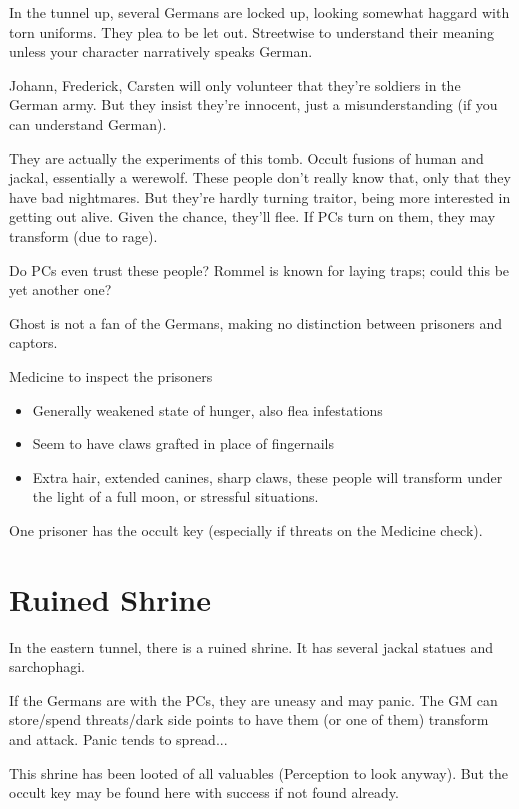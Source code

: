 \documentclass{book}
\newcommand{\df}{\DifficultyDie }
\newcommand{\stb}{\SetbackDie }
\newcommand{\ch}{\ChallengeDie }
\begin{document}
\begin{multicols}{2}
In the tunnel up, several Germans are locked up, looking somewhat haggard with torn uniforms.  They plea to be let out.  \df\df Streetwise to understand their meaning unless your character narratively speaks German.

Johann, Frederick, Carsten will only volunteer that they're soldiers in the German army.  But they insist they're innocent, just a misunderstanding (if you can understand German).

They are actually the experiments of this tomb.  Occult fusions of human and jackal, essentially a werewolf.  These people don't really know that, only that they have bad nightmares.  But they're hardly turning traitor, being more interested in getting out alive.  Given the chance, they'll flee.  If PCs turn on them, they may transform (due to rage).

Do PCs even trust these people?  Rommel is known for laying traps; could this be yet another one?

Ghost is not a fan of the Germans, making no distinction between prisoners and captors.

\df\df\stb\stb Medicine to inspect the prisoners
    \begin{itemize}
        \item \Success Generally weakened state of hunger, also flea infestations
        \item \Advantage\Advantage Seem to have claws grafted in place of fingernails
        \item \Triumph Extra hair, extended canines, sharp claws, these people will transform under the light of a full moon, or stressful situations.
    \end{itemize}

One prisoner has the occult key (especially if threats on the Medicine check).

\section{Ruined Shrine}

In the eastern tunnel, there is a ruined shrine.  It has several jackal statues and sarchophagi.

If the Germans are with the PCs, they are uneasy and may panic.  The GM can store/spend threats/dark side points to have them (or one of them) transform and attack.  Panic tends to spread...

This shrine has been looted of all valuables (\ch\df\stb\stb Perception to look anyway).  But the occult key may be found here with success if not found already.


\end{multicols}
\end{document}
